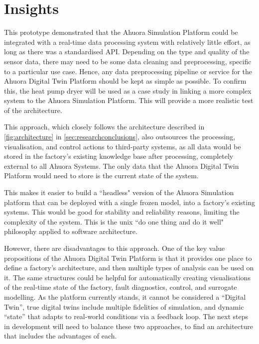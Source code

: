 \section{Insights} \label{sec:prototypeinsights}

This prototype demonstrated that the Ahuora Simulation Platform could be integrated with a real-time data processing system with relatively little effort, as long as there was a standardised API. 
Depending on the type and quality of the sensor data, there may need to be some data cleaning and preprocessing, specific to a particular use case. 
Hence, any data preprocessing pipeline or service for the Ahuora Digital Twin Platform should be kept as simple as possible.
To confirm this, the heat pump dryer will be used as a case study in linking a more complex system to the Ahuora Simulation Platform. This will provide a more realistic test of the architecture.

This approach, which closely follows the architecture described in \cref{fig:architecture} in \cref{sec:researchconclusions}, also outsources the processing, visualisation, and control actions to third-party systems, as all data would be stored in the factory's existing knowledge base after processing, completely external to all Ahuora Systems. The only data that the Ahuora Digital Twin Platform would need to store is the current state of the system. 

This makes it easier to build a ``headless" version of the Ahuora Simulation platform that can be deployed with a single frozen model, into a factory's existing systems. 
This would be good for stability and reliability reasons, limiting the complexity of the system. This is the unix ``do one thing and do it well" philosophy applied to software architecture.


However, there are disadvantages to this approach. One of the key value propositions of the Ahuora Digital Twin Platform is that it provides one place to define a factory's architecture, and then multiple types of analysis can be used on it. The same structures could be helpful for automatically creating visualisations of the real-time state of the factory, fault diagnostics, control, and surrogate modelling. As the platform currently stands, it cannot be considered a ``Digital Twin'', true digital twins include multiple fidelities of simulation, and dynamic ``state'' that adapts to real-world conditions via a feedback loop. The next steps in development will need to balance these two approaches, to find an architecture that includes the advantages of each.
